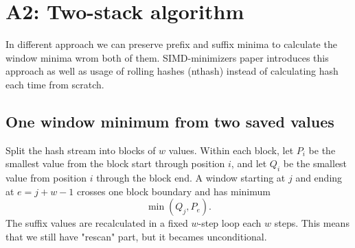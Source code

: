 \section{A2: Two-stack algorithm}
\label{sec:rewrite-sea-simd-minimizers}

In different approach we can preserve prefix and suffix minima to calculate the window minima wrom both of them. SIMD-minimizers paper introduces this approach as well as usage of rolling hashes (nthash) instead of calculating hash each time from scratch. \cite{groot_koerkamp_simd_minimizers_2025}

\subsection{One window minimum from two saved values}

Split the hash stream into blocks of $w$ values.  Within each block, let
$P_i$ be the smallest value from the block start through position $i$, and let
$Q_i$ be the smallest value from position $i$ through the block end.  A window
starting at $j$ and ending at $e=j+w-1$ crosses one block boundary and has
minimum
\[
  \min(Q_j,P_e).
\]
The suffix values are recalculated in a fixed $w$-step loop each $w$ steps. This means that we still have "rescan" part, but it becames unconditional.


